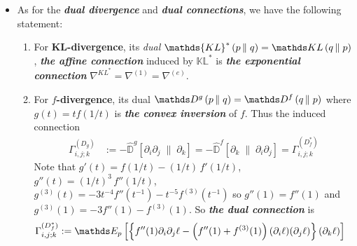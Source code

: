 \documentclass[11pt]{article}
\begin{document}
\begin{itemize}
\item  \begin{example} 
As for the \emph{\textbf{dual divergence}} and \emph{\textbf{dual connections}}, we have the following statement: 
\begin{enumerate}
\item For \textbf{KL-divergence}, its \emph{dual} $\mathds{KL}^{*}\left( p \left\|\right. q \right) = \kl{q}{p}$, \emph{\textbf{the affine connection}} induced by $\mathds{KL}^{*}$ is \emph{\textbf{the exponential connection}} $\nabla^{KL^{*}} = \nabla^{(1)} = \nabla^{(e)}$.
\item For \textbf{$f$-divergence}, its dual $\divg{g}{p}{q} = \divg{f}{q}{p}$ where $g(t) = t f(1/t)$ is \emph{\textbf{the convex inversion}} of $f$. Thus the induced connection
\begin{align*}
\Gamma_{i,j;k}^{(D_g)} &:= - \widehat{\mathds{D}}^{g}\left[ \partial_i \partial_j \;\|\;  \partial_k \right] = - \widehat{\mathds{D}}^{f}\left[ \partial_k  \;\|\; \partial_i \partial_j  \right] = \Gamma_{i,j;k}^{(D_f^{*})}
\end{align*} Note that $g'(t) = f(1/t) - (1/t)\,f'(1/t)$, $g''(t) = (1/t)^3\,f''(1/t)$, $g^{(3)}(t) = -3 t^{-4}f''(t^{-1}) - t^{-5}f^{(3)}(t^{-1})$ so $g''(1) = f''(1)$ and $g^{(3)}(1)= -3 f''(1) - f^{(3)}(1)$. So \emph{\textbf{the dual connection}} is
\begin{align*}
\Gamma_{i,j;k}^{(D_f^{*})} &:=\E{p}{\set{f''(1)\partial_i \partial_j \ell - \paren{f''(1) + f^{(3)}(1)}(\partial_i \ell)(\partial_j \ell)}(\partial_k \ell)}  
\end{align*}
\end{enumerate}
\end{example}
\end{itemize}
\end{document}
